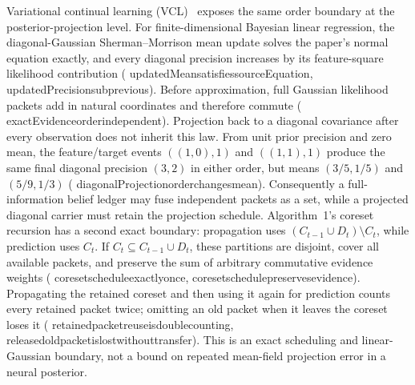 \documentclass[11pt]{article}
\newcommand{\leanname}[1]{{\scriptsize\ttfamily
  \def\_{\textunderscore\allowbreak}#1}}
\begin{document}
Variational continual learning (VCL)~\cite{nguyen2018vcl} exposes the same
order boundary at the posterior-projection level.  For finite-dimensional
Bayesian linear regression, the diagonal-Gaussian Sherman--Morrison mean
update solves the paper's normal equation exactly, and every diagonal
precision increases by its feature-square likelihood contribution
(\leanname{updatedMean\_satisfies\_sourceEquation},
\leanname{updatedPrecision\_sub\_previous}).  Before approximation, full
Gaussian likelihood packets add in natural coordinates and therefore commute
(\leanname{exactEvidence\_order\_independent}).  Projection back to a
diagonal covariance after every observation does not inherit this law.  From
unit prior precision and zero mean, the feature/target events
$((1,0),1)$ and $((1,1),1)$ produce the same final diagonal precision
$(3,2)$ in either order, but means $(3/5,1/5)$ and $(5/9,1/3)$
(\leanname{diagonalProjection\_order\_changes\_mean}).
Consequently a full-information belief ledger may fuse independent packets
as a set, while a projected diagonal carrier must retain the projection
schedule.  Algorithm~1's coreset recursion has a second exact boundary:
propagation uses $(C_{t-1}\cup D_t)\setminus C_t$, while prediction uses
$C_t$.  If $C_t\subseteq C_{t-1}\cup D_t$, these partitions are disjoint,
cover all available packets, and preserve the sum of arbitrary commutative
evidence weights
(\leanname{coreset\_schedule\_exactly\_once},
\leanname{coreset\_schedule\_preserves\_evidence}).  Propagating the retained
coreset and then using it again for prediction counts every retained packet
twice; omitting an old packet when it leaves the coreset loses it
(\leanname{retained\_packet\_reuse\_is\_double\_counting},
\leanname{released\_old\_packet\_is\_lost\_without\_transfer}).
This is an exact scheduling and linear-Gaussian boundary, not a bound on
repeated mean-field projection error in a neural posterior.
\end{document}
